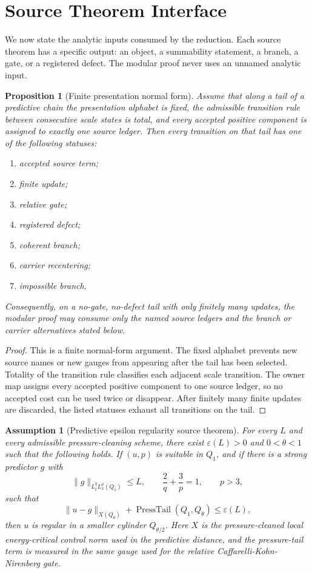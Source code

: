 \documentclass[11pt]{article}
\newtheorem{proposition}[theorem]{Proposition}
\newtheorem{assumption}[theorem]{Assumption}
\begin{document}
\section{Source Theorem Interface}

We now state the analytic inputs consumed by the reduction.  Each source theorem
has a specific output: an object, a summability statement, a branch, a gate, or a
registered defect.  The modular proof never uses an unnamed analytic input.

\begin{proposition}[Finite presentation normal form]
Assume that along a tail of a predictive chain the presentation alphabet is
fixed, the admissible transition rule between consecutive scale states is total,
and every accepted positive component is assigned to exactly one source ledger.
Then every transition on that tail has one of the following statuses:
\begin{enumerate}[label=(\roman*)]
\item accepted source term;
\item finite update;
\item relative gate;
\item registered defect;
\item coherent branch;
\item carrier recentering;
\item impossible branch.
\end{enumerate}
Consequently, on a no-gate, no-defect tail with only finitely many updates, the
modular proof may consume only the named source ledgers and the branch or carrier
alternatives stated below.
\end{proposition}

\begin{proof}
This is a finite normal-form argument.  The fixed alphabet prevents new source
names or new gauges from appearing after the tail has been selected.  Totality of
the transition rule classifies each adjacent scale transition.  The owner map
assigns every accepted positive component to one source ledger, so no accepted
cost can be used twice or disappear.  After finitely many finite updates are
discarded, the listed statuses exhaust all transitions on the tail.
\end{proof}

\begin{assumption}[Predictive epsilon regularity source theorem]
For every \(L\) and every admissible pressure-cleaning scheme, there exist
\(\varepsilon(L)>0\) and \(0<\theta<1\) such that the following holds.  If
\((u,p)\) is suitable in \(Q_1\), and if there is a strong predictor \(g\) with
\[
\|g\|_{L^q_tL^p_x(Q_1)}\le L,
\qquad
\frac2q+\frac3p=1,
\qquad
p>3,
\]
such that
\[
\|u-g\|_{X(Q_\theta)}
+\operatorname{PressTail}(Q_1,Q_\theta)
\le\varepsilon(L),
\]
then \(u\) is regular in a smaller cylinder \(Q_{\theta/2}\).  Here \(X\) is the
pressure-cleaned local energy-critical control norm used in the predictive
distance, and the pressure-tail term is measured in the same gauge used for the
relative Caffarelli-Kohn-Nirenberg gate.
\end{assumption}
\end{document}
